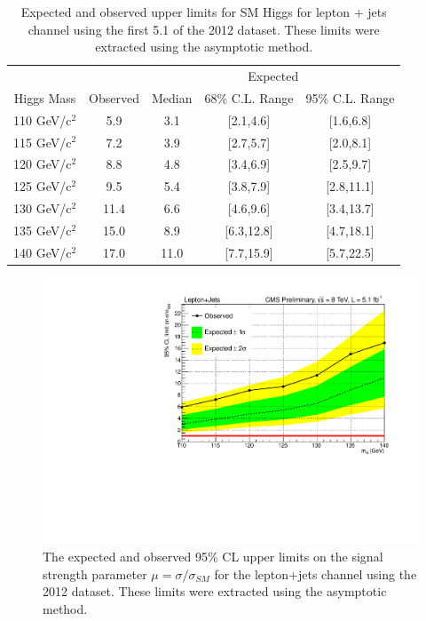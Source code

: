 \begin{table}[hbtp] 
  \centering 
{
\begin{tabular}{|c|c|ccc|} \hline 
           &          & \multicolumn{3}{c|}{Expected} \\
Higgs Mass & Observed & Median & 68\% C.L. Range &  95\% C.L. Range  \\ \hline
110 GeV/c$^2$ & 5.9 & 3.1 & [2.1,4.6] & [1.6,6.8] \\
115 GeV/c$^2$ & 7.2 & 3.9 & [2.7,5.7] & [2.0,8.1] \\
120 GeV/c$^2$ & 8.8 & 4.8 & [3.4,6.9] & [2.5,9.7] \\
125 GeV/c$^2$ & 9.5 & 5.4 & [3.8,7.9] & [2.8,11.1] \\
130 GeV/c$^2$ & 11.4 & 6.6 & [4.6,9.6] & [3.4,13.7] \\
135 GeV/c$^2$ & 15.0 & 8.9 & [6.3,12.8] & [4.7,18.1] \\
140 GeV/c$^2$ & 17.0 & 11.0 & [7.7,15.9] & [5.7,22.5] \\
\hline
\end{tabular}}
    \caption{Expected and observed upper limits for SM Higgs for
      lepton + jets channel using the first 5.1 \fbinv of the 2012 dataset.  These limits were extracted using the asymptotic method.} 	
  \label{tab:lvjj_limitTable}
\end{table} 


\begin{figure}[hbtp] 
  {\centering
    \includegraphics[width=1.0\textwidth]{Figures/Analysis_1_Diagrams/limits_lj_ttH_mH_limit_ExpAndObs_shape.pdf}
    \caption{The expected and observed 95\% CL upper limits on the signal strength parameter $\mu = \sigma / \sigma_{SM}$ for the lepton+jets channel using the 2012 dataset.  These limits were extracted using the asymptotic method.}
    \label{fig:lvjj_limit}}
\end{figure}

